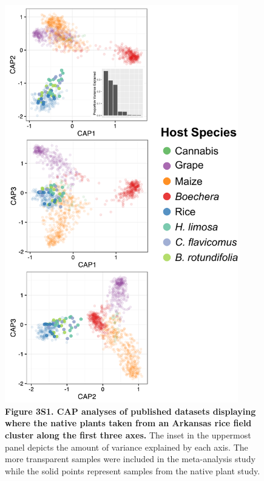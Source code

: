 \newpage

\begin{figure}[h]
\centering
\includegraphics[width=4in]{Figures/figure2_s1}
\captionsetup{labelformat=empty}
\caption[Figure 3S1]{\textbf{Figure 3S1. CAP analyses of published datasets displaying where the native plants taken from an Arkansas rice field cluster along the first three axes.} The inset in the uppermost panel depicts the amount of variance explained by each axis. The more transparent samples were included in the meta-analysis study while the solid points represent samples from the native plant study.}
\label{Figure 3S1}
\end{figure}

\newpage

